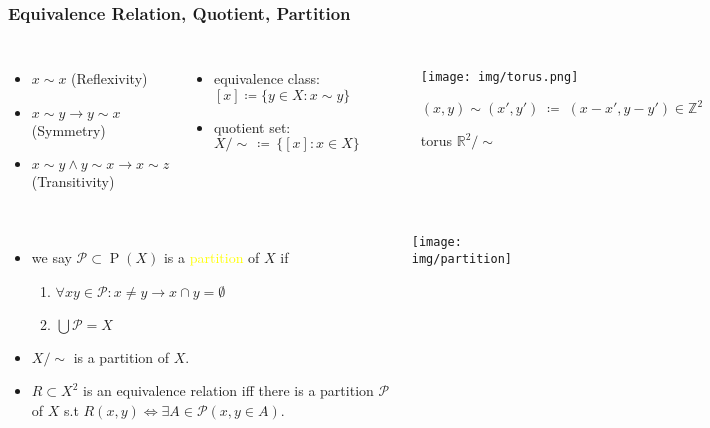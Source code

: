 \documentclass[UTF8,11pt,colorlinks,compress,openany]{beamer}%
\begin{document}
\begin{frame}\frametitle{Equivalence Relation, Quotient, Partition}
\begin{columns}
	\begin{itemize}
		\item $x\sim x$ \quad (Reflexivity)
		\item $x\sim y\to y\sim x$ \quad (Symmetry)
		\item $x\sim y\wedge y\sim x\to x\sim z$ \quad (Transitivity)
	\end{itemize}
\begin{itemize}
	\item equivalence class: $[x]\coloneqq \{y\in X: x\sim y\}$
	\item quotient set: $X/\sim\,\coloneqq \,\big\{[x]: x\in X\big\}$
\end{itemize}
\vspace{-6ex}
\begin{figure}[H]
\texttt{[image: img/torus.png]}\vspace{-5ex}\caption{torus $\mathbb{R}^2/\sim$}{\scriptsize $(x,y)\sim(x',y')\;\coloneqq \;(x-x',y-y')\in\mathbb{Z}^2$}
\end{figure}
\end{columns}
\begin{columns}
\begin{itemize}
	\item we say $\mathcal{P}\subset \operatorname{P}(X)$ is a \textcolor{yellow}{partition} of $X$ if
	\begin{enumerate}
		\item $\forall xy\in\mathcal{P}: x\neq y\to x\cap y=\emptyset$
		\item $\bigcup\mathcal{P}=X$
	\end{enumerate}
	\item $X/\sim$ is a partition of $X$.
	\item $R\subset X^2$ is an equivalence relation iff there is a partition $\mathcal{P}$ of $X$ s.t $R(x,y)\iff\exists A\in\mathcal{P} (x,y\in A)$.
\end{itemize}
\texttt{[image: img/partition]}
\end{columns}
\end{frame}
\end{document}
